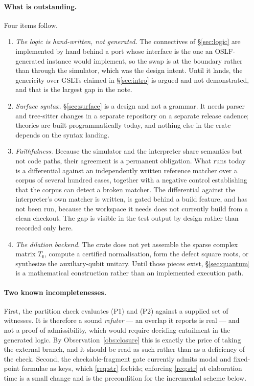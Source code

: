 \documentclass[11pt,a4paper]{article}
\theoremstyle{plain}
\theoremstyle{definition}
\theoremstyle{remark}
\begin{document}
\paragraph{What is outstanding.} Four items follow.
\begin{enumerate}[leftmargin=2.2em]
\item \emph{The logic is hand-written, not generated.} The connectives of \S\ref{sec:logic} are
implemented by hand behind a port whose interface is the one an OSLF-generated instance would
implement, so the swap is at the boundary rather than through the simulator, which was the design
intent. Until it lands, the genericity over GSLTs claimed in \S\ref{sec:intro} is argued and not
demonstrated, and that is the largest gap in the note.
\item \emph{Surface syntax.} \S\ref{sec:surface} is a design and not a grammar. It needs parser and
tree-sitter changes in a separate repository on a separate release cadence; theories are built
programmatically today, and nothing else in the crate depends on the syntax landing.
\item \emph{Faithfulness.} Because the simulator and the interpreter share semantics but not code
paths, their agreement is a permanent obligation. What runs today is a differential against an
independently written reference matcher over a corpus of several hundred cases, together with a
negative control establishing that the corpus can detect a broken matcher. The differential against
the interpreter's own matcher is written, is gated behind a build feature, and has not been run,
because the workspace it needs does not currently build from a clean checkout. The gap is visible in
the test output by design rather than recorded only here.
\item \emph{The dilation backend.} The crate does not yet assemble the sparse complex matrix $T_0$,
compute a certified normalisation, form the defect square roots, or synthesize the auxiliary-qubit
unitary. Until those pieces exist, \S\ref{sec:quantum} is a mathematical construction rather than an
implemented execution path.
\end{enumerate}

\paragraph{Two known incompletenesses.} First, the partition check evaluates (P1) and (P2) against a
supplied set of witnesses. It is therefore a sound \emph{refuter} --- an overlap it reports is real
--- and not a proof of admissibility, which would require deciding entailment in the generated logic.
By Observation~\ref{obs:closure} this is exactly the price of taking the external branch, and it
should be read as such rather than as a deficiency of the check. Second, the checkable-fragment gate
currently admits modal and fixed-point formulae as keys, which \ref{req:str} forbids; enforcing
\ref{req:str} at elaboration time is a small change and is the precondition for the incremental
scheme below.
\end{document}
